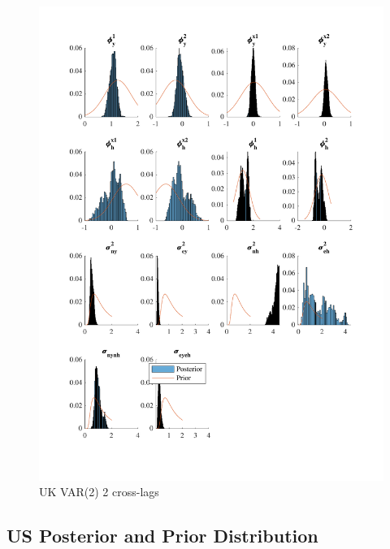 \documentclass[
  12pt,
]{article}
\begin{document}
\begin{figure}

{\centering \includegraphics[width=0.85\linewidth]{../../Regression/Bayesian_UC_VAR2_nodrift_Crosscycle2lags/OutputData/posteriorpriordistribution_GB} 

}

\caption{UK VAR(2) 2 cross-lags}\label{fig:unnamed-chunk-11}
\end{figure}

\clearpage

\hypertarget{us-posterior-and-prior-distribution}{%
\subsection{US Posterior and Prior Distribution}\label{us-posterior-and-prior-distribution}}
\end{document}
